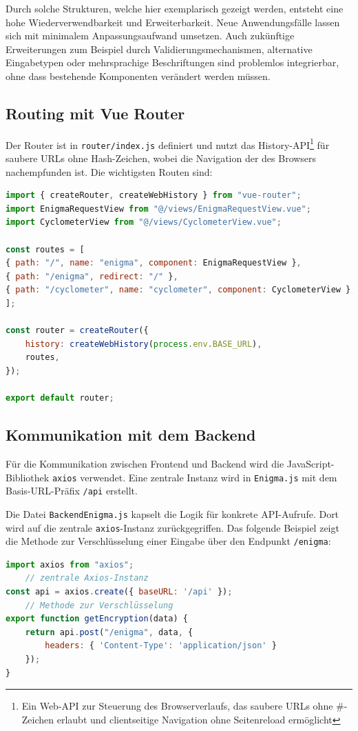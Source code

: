 \documentclass[12pt, ngerman, a4paper, numbers=noenddot]{article}
\begin{document}
Durch solche Strukturen, welche hier exemplarisch gezeigt werden, entsteht eine hohe Wiederverwendbarkeit und Erweiterbarkeit. Neue Anwendungsfälle lassen sich mit minimalem Anpassungsaufwand umsetzen. Auch zukünftige Erweiterungen zum Beispiel durch Validierungsmechanismen, alternative Eingabetypen oder mehrsprachige Beschriftungen sind problemlos integrierbar, ohne dass bestehende Komponenten verändert werden müssen.


\subsection{Routing mit Vue Router}

Der Router ist in \lstinline|router/index.js| definiert und nutzt das History-API\footnote{Ein Web-API zur Steuerung des Browserverlaufs, das saubere URLs ohne \#-Zeichen erlaubt und clientseitige Navigation ohne Seitenreload ermöglicht} für saubere URLs ohne Hash-Zeichen, wobei die Navigation der des Browsers nachempfunden ist. Die wichtigsten Routen sind:


\begin{lstlisting}[language=JavaScript, caption=Vue Router Konfiguration]
import { createRouter, createWebHistory } from "vue-router";
import EnigmaRequestView from "@/views/EnigmaRequestView.vue";
import CyclometerView from "@/views/CyclometerView.vue";

const routes = [
{ path: "/", name: "enigma", component: EnigmaRequestView },
{ path: "/enigma", redirect: "/" },
{ path: "/cyclometer", name: "cyclometer", component: CyclometerView },
];

const router = createRouter({
	history: createWebHistory(process.env.BASE_URL),
	routes,
});

export default router;
\end{lstlisting}


\subsection{Kommunikation mit dem Backend}

Für die Kommunikation zwischen Frontend und Backend wird die JavaScript-Bibliothek \lstinline|axios| verwendet. Eine zentrale Instanz wird in \lstinline|Enigma.js| mit dem Basis-URL-Präfix \lstinline|/api| erstellt.

Die Datei \lstinline|BackendEnigma.js| kapselt die Logik für konkrete API-Aufrufe. Dort wird auf die zentrale \lstinline|axios|-Instanz zurückgegriffen. Das folgende Beispiel zeigt die Methode zur Verschlüsselung einer Eingabe über den Endpunkt \lstinline|/enigma|:
\newpage
\begin{lstlisting}[language=JavaScript, caption=API-Aufruf in \texttt{BackendEnigma.js}]
import axios from "axios";
	// zentrale Axios-Instanz
const api = axios.create({ baseURL: '/api' });
	// Methode zur Verschlüsselung
export function getEncryption(data) {
	return api.post("/enigma", data, {
		headers: { 'Content-Type': 'application/json' }
	});
}
\end{lstlisting}
\end{document}
